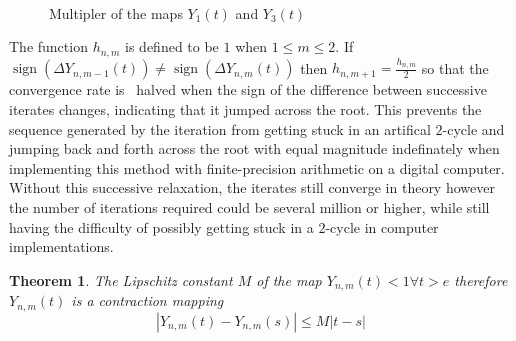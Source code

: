\documentclass{elsarticle}
\newcommand{\tmop}[1]{\ensuremath{\operatorname{#1}}}
\newtheorem{theorem}{Theorem}
\begin{document}
\

\begin{figure}[h]
  \caption{Multipler of the maps $Y_1 (t)$ and $Y_3 (t)$}
\end{figure}

\begin{remark}
  The function $h_{n, m}$ is defined to be $1$ when $1 \leqslant m \leqslant
  2$. If $\tmop{sign} (\Delta Y^{}_{n, m - 1} (t)) \neq \tmop{sign} (\Delta
  Y^{}_{n, m} (t))$ then $h_{n, m + 1} = \frac{h_{n, m}}{2}$ so that the
  convergence rate is \ halved when the sign of the difference between
  successive iterates changes, indicating that it jumped across the root. This
  prevents the sequence generated by the iteration from getting stuck in an
  artifical $2$-cycle and jumping back and forth across the root with equal
  magnitude indefinately when implementing this method with finite-precision
  arithmetic on a digital computer. Without this successive relaxation, the
  iterates still converge in theory however the number of iterations required
  could be several million or higher, while still having the difficulty of
  possibly getting stuck in a $2$-cycle in computer implementations.
\end{remark}

\begin{theorem}
  \label{cm}The Lipschitz constant $M$ of the map $Y_{n, m} (t) < 1 \forall t
  > e$ therefore $Y_{n, m} (t)$ is a contraction mapping
  \begin{equation}
    | Y_{n, m} (t) - Y_{n, m} (s) | \leqslant M | t - s |
  \end{equation}
\end{theorem}
\end{document}
